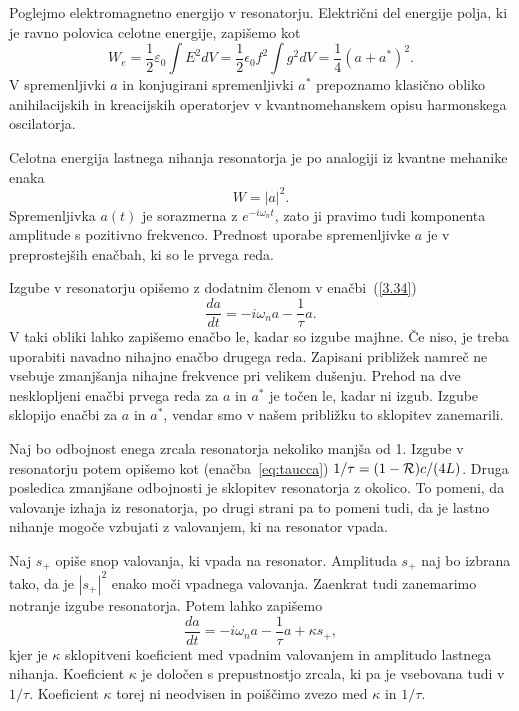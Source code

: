 Poglejmo elektromagnetno energijo v resonatorju. Električni
del energije polja, ki je ravno polovica celotne energije, zapišemo kot
\begin{equation}
W_e = \frac{1}{2}\varepsilon_0 \int E^2 dV = \frac{1}{2}\epsilon_{0}f^{2}
\int g^{2}dV = \frac{1}{4} (a+a^{*})^2.
\end{equation}
V spremenljivki $a$ in konjugirani spremenljivki $a^{*}$ prepoznamo 
klasično obliko anihilacijskih in kreacijskih operatorjev v kvantnomehanskem 
opisu harmonskega oscilatorja. 

Celotna energija lastnega nihanja resonatorja je po analogiji iz kvantne mehanike enaka
\begin{equation}
W=|a|^2.
\label{3.35}
\end{equation}
Spremenljivka $a(t)$ je sorazmerna z $e^{-i\omega_{n}t}$, 
zato ji pravimo tudi komponenta amplitude s pozitivno frekvenco. 
Prednost uporabe spremenljivke $a$ je v preprostejših enačbah, ki so le prvega reda. 

Izgube v resonatorju opišemo z dodatnim členom v enačbi~(\ref{3.34})
\begin{equation}
\frac{da}{dt}=-i\omega_{n}a-\frac{1}{\tau}a.
\label{3.36}
\end{equation}
V taki obliki lahko zapišemo enačbo le, kadar so izgube majhne. Če niso, 
je treba uporabiti navadno nihajno enačbo drugega reda. Zapisani približek
namreč ne vsebuje zmanjšanja nihajne frekvence pri velikem dušenju.
Prehod na dve nesklopljeni enačbi prvega reda za $a$ in $a^*$
je točen le, kadar ni izgub. Izgube sklopijo enačbi za $a$ in $a^{\ast}$, 
vendar smo v našem približku to sklopitev zanemarili.

Naj bo odbojnost enega zrcala resonatorja nekoliko manjša od 1. Izgube v resonatorju 
potem opišemo kot (enačba~\ref{eq:taucca}) $1/\tau=(1-{\cal R})c/(4L)$. Druga posledica
zmanjšane odbojnosti je sklopitev resonatorja z okolico. To pomeni, 
da valovanje izhaja iz resonatorja, po drugi strani pa to pomeni tudi, da je 
lastno nihanje mogoče vzbujati z valovanjem, ki na resonator vpada.

Naj $s_{+}$ opiše snop valovanja, ki vpada na resonator. Amplituda $s_{+}$
naj bo izbrana tako, da je $|s_{+}|^{2}$ enako moči vpadnega valovanja. Zaenkrat
tudi zanemarimo notranje izgube resonatorja. Potem lahko
zapišemo 
\begin{equation}
\frac{da}{dt}=-i\omega_{n}a-\frac{1}{\tau}a+\kappa s_{+},
\label{3.37}
\end{equation}
kjer je $\kappa$ sklopitveni koeficient med vpadnim valovanjem in
amplitudo lastnega nihanja. Koeficient $\kappa$ je določen
s prepustnostjo zrcala, ki pa je vsebovana tudi v $1/\tau$. Koeficient
$\kappa$ torej ni neodvisen in poiščimo zvezo med $\kappa$ in $1/\tau$.

